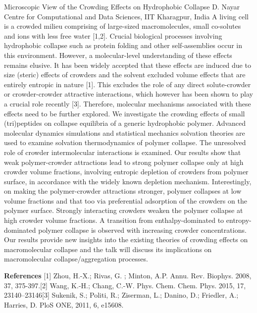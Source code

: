 
    \begin{abstract_online}{Microscopic View of the Crowding Effects on Hydrophobic Collapse}{%
        D. Nayar}{%
        \IStag}{%
        Centre for Computational and Data Sciences, IIT Kharagpur, India}
    A living cell is a crowded milieu comprising of large-sized macromolecules, small co-solutes  and ions with less free water [1,2]. Crucial biological processes involving hydrophobic collapse  such as protein folding and other self-assemblies occur in this environment. However, a  molecular-level understanding of these effects remains elusive. It has been widely accepted that  these effects are induced due to size (steric) effects of crowders and the solvent excluded  volume effects that are entirely entropic in nature [1]. This excludes the role of any direct  solute-crowder or crowder-crowder attractive interactions, which however has been shown to  play a crucial role recently [3]. Therefore, molecular mechanisms associated with these effects  need to be further explored. We investigate the crowding effects of small (tri)peptides on  collapse equilibria of a generic hydrophobic polymer. Advanced molecular dynamics  simulations and statistical mechanics solvation theories are used to examine solvation  thermodynamics of polymer collapse. The unresolved role of crowder intermolecular  interactions is examined. Our results show that weak polymer-crowder attractions lead to strong  polymer collapse only at high crowder volume fractions, involving entropic depletion of  crowders from polymer surface, in accordance with the widely known depletion mechanism.  Interestingly, on making the polymer-crowder attractions stronger, polymer collapses at low  volume fractions and that too via preferential adsorption of the crowders on the polymer  surface. Strongly interacting crowders weaken the polymer collapse at high crowder volume  fractions. A transition from enthalpy-dominated to entropy-dominated polymer collapse is  observed with increasing crowder concentrations. Our results provide new insights into the  existing theories of crowding effects on macromolecular collapse and the talk will discuss its  implications on macromolecular collapse/aggregation processes.  
    
        \textbf{References} \newline{}[1] Zhou, H.-X.; Rivas, G. ; Minton, A.P. Annu. Rev. Biophys. 2008, 37, 375-397.\newline{}[2] Wang, K.-H.; Chang, C.-W. Phys. Chem. Chem. Phys. 2015, 17, 23140–23146\newline{}[3] Sukenik, S.; Politi, R.; Ziserman, L.; Danino, D.; Friedler, A.; Harries, D. PloS ONE, 2011, 6, e15608.
    \end{abstract_online}
    